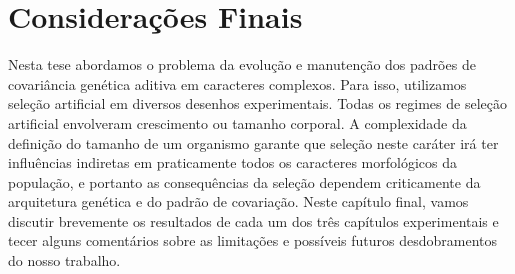 \pagestyle{empty}
\cleardoublepage
\pagestyle{fancy}



\chapter{Considerações Finais}

\begin{refsection}

Nesta tese abordamos o problema da evolução e manutenção dos padrões de
covariância genética aditiva em caracteres complexos. Para isso, utilizamos
seleção artificial em diversos desenhos experimentais. Todas os regimes de
seleção artificial envolveram crescimento ou tamanho corporal. A complexidade
da definição do tamanho de um organismo garante que seleção neste caráter irá
ter influências indiretas em praticamente todos os caracteres morfológicos da
população, e portanto as consequências da seleção dependem criticamente da
arquitetura genética e do padrão de covariação. Neste capítulo final, vamos
discutir brevemente os resultados de cada um dos três capítulos experimentais
e tecer alguns comentários sobre as limitações e possíveis futuros
desdobramentos do nosso trabalho.


\end{refsection}
